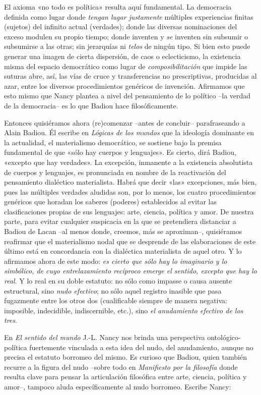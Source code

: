 El axioma «no todo es política» resulta aquí fundamental. La democracia definida como lugar donde \emph{tengan lugar justamente} múltiples experiencias finitas (sujetos) del infinito actual (verdades); donde las diversas nominaciones del exceso modulen su propio tiempo; donde inventen y \emph{se} inventen sin subsumir o subsumirse a las otras; sin jerarquías ni \emph{telos} de ningún tipo. Si bien esto puede generar una imagen de cierta dispersión, de caos o eclecticismo, la existencia misma del espacio democrático como lugar de \emph{composibilitación} que impide las suturas abre, así, las vías de cruce y transferencias no prescriptivas, producidas al azar, entre los diversos procedimientos genéricos de invención. Afirmamos que esto mismo que Nancy plantea a nivel del pensamiento de lo político --la verdad de la democracia-- es lo que Badiou hace filosóficamente.

Entonces quisiéramos ahora (re)comenzar --antes de concluir-- parafraseando a Alain Badiou. Él escribe en \emph{Lógicas de los mundos} que la ideología dominante en la actualidad, el materialismo democrático, se sostiene bajo la premisa fundamental de que «sólo hay cuerpos y lenguajes». Es cierto, dirá Badiou, «excepto que hay verdades». La excepción, inmanente a la existencia absolutista de cuerpos y lenguajes, es pronunciada en nombre de la reactivación del pensamiento dialéctico materialista. Habrá que decir «las» excepciones, más bien, pues las múltiples verdades aludidas son, por lo menos, los cuatro procedimientos genéricos que horadan los saberes (poderes) establecidos al evitar las clasificaciones propias de sus lenguajes: arte, ciencia, política y amor. De nuestra parte, para evitar cualquier suspicacia en la que se pretendiera distanciar a Badiou de Lacan --al menos donde, creemos, más se aproximan--, quisiéramos reafirmar que el materialismo nodal que se desprende de las elaboraciones de este último está en concordancia con la dialéctica materialista de aquel otro. Y lo afirmamos ahora de este modo: \emph{es cierto que sólo hay lo imaginario y lo simbólico, de cuyo entrelazamiento recíproco emerge el sentido, excepto que hay lo real}. Y lo real en su doble estatuto: no sólo como impasse o causa ausente estructural, sino \emph{nudo efectivo}; no sólo aquel registro inasible que pasa fugazmente entre los otros dos (cualificable siempre de manera negativa: imposible, indecidible, indiscernible, etc.), sino \emph{el anudamiento efectivo de los tres}.

En \emph{El sentido del mundo} J.-L. Nancy nos brinda una perspectiva ontológico-política fuertemente vinculada a esta idea del nudo, del anudamiento, aunque no precisa el estatuto borromeo del mismo. Es curioso que Badiou, quien también recurre a la figura del nudo --sobre todo en \emph{Manifiesto por la filosofía} donde resulta clave para pensar la articulación filosófica entre arte, ciencia, política y amor--, tampoco aluda específicamente al nudo borromeo. Escribe Nancy:

